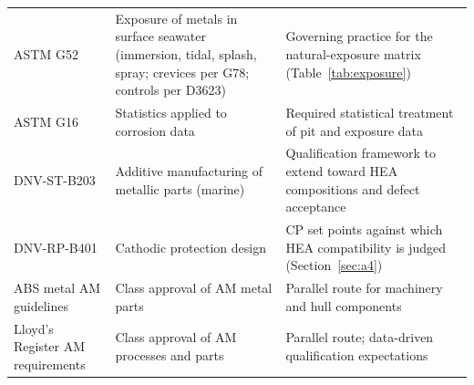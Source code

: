 \begin{table}[t]
\begin{tabularx}{\textwidth}{@{}lXX@{}}
ASTM G52 \cite{astm_g52} & Exposure of metals in surface seawater (immersion, tidal, splash, spray; crevices per G78; controls per D3623) & Governing practice for the natural-exposure matrix (Table~\ref{tab:exposure}) \\
ASTM G16 \cite{astm_g16} & Statistics applied to corrosion data & Required statistical treatment of pit and exposure data \\
DNV-ST-B203 \cite{dnvstb203} & Additive manufacturing of metallic parts (marine) & Qualification framework to extend toward HEA compositions and defect acceptance \\
DNV-RP-B401 \cite{dnv_rpb401} & Cathodic protection design & CP set points against which HEA compatibility is judged (Section~\ref{sec:a4}) \\
ABS metal AM guidelines \cite{abs_mam} & Class approval of AM metal parts & Parallel route for machinery and hull components \\
Lloyd's Register AM requirements \cite{lr_am} & Class approval of AM processes and parts & Parallel route; data-driven qualification expectations \\
\bottomrule
\end{tabularx}
\end{table}
